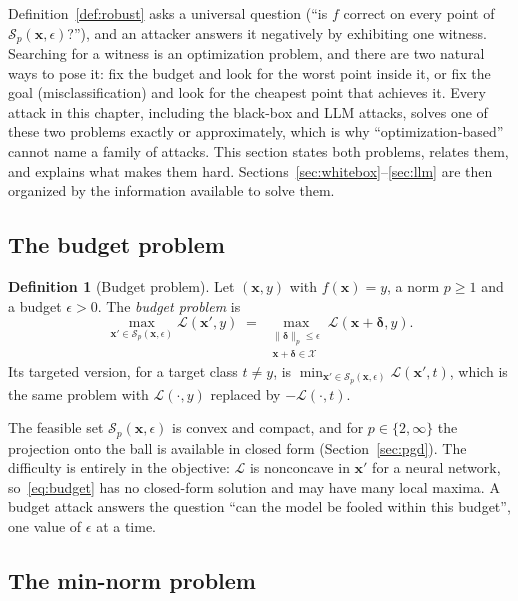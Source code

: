 \documentclass[10pt,a4paper]{extarticle}
\theoremstyle{definition}
\newtheorem{definition}{Definition}[section]
\newcommand{\X}{\mathcal{X}}
\newcommand{\Loss}{\mathcal{L}}
\newcommand{\x}{\mathbf{x}}
\newcommand{\xadv}{\mathbf{x}'}
\newcommand{\bdelta}{\boldsymbol{\delta}}
\begin{document}
Definition~\ref{def:robust} asks a universal question (\enquote{is \(f\) correct on every point of \(\mathcal{S}_p(\x,\epsilon)\)?}), and an attacker answers it negatively by exhibiting one witness. Searching for a witness is an optimization problem, and there are two natural ways to pose it: fix the budget and look for the worst point inside it, or fix the goal (misclassification) and look for the cheapest point that achieves it. Every attack in this chapter, including the black-box and LLM attacks, solves one of these two problems exactly or approximately, which is why \enquote{optimization-based} cannot name a family of attacks. This section states both problems, relates them, and explains what makes them hard. Sections~\ref{sec:whitebox}--\ref{sec:llm} are then organized by the information available to solve them.

\subsection{The budget problem}

\begin{definition}[Budget problem]\label{def:budget}
Let \((\x,y)\) with \(f(\x)=y\), a norm \(p\ge1\) and a budget \(\epsilon>0\). The \emph{budget problem} is
\begin{equation}\label{eq:budget}
\max_{\xadv\in\mathcal{S}_p(\x,\epsilon)}\Loss(\xadv,y)
\;=\;
\max_{\substack{\|\bdelta\|_p\le\epsilon\\ \x+\bdelta\in\X}}\Loss(\x+\bdelta,y).
\end{equation}
Its targeted version, for a target class \(t\neq y\), is \(\min_{\xadv\in\mathcal{S}_p(\x,\epsilon)}\Loss(\xadv,t)\), which is the same problem with \(\Loss(\cdot,y)\) replaced by \(-\Loss(\cdot,t)\).
\end{definition}

The feasible set \(\mathcal{S}_p(\x,\epsilon)\) is convex and compact, and for \(p\in\{2,\infty\}\) the projection onto the ball is available in closed form (Section~\ref{sec:pgd}). The difficulty is entirely in the objective: \(\Loss\) is nonconcave in \(\xadv\) for a neural network, so~\eqref{eq:budget} has no closed-form solution and may have many local maxima. A budget attack answers the question \enquote{can the model be fooled within this budget}, one value of \(\epsilon\) at a time.

\subsection{The min-norm problem}
\end{document}

